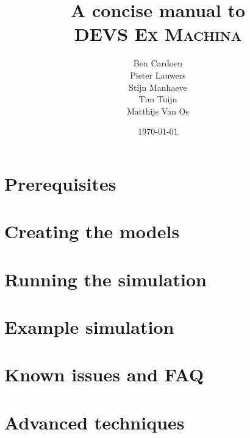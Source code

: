 \documentclass[10pt,a4paper]{report}
\title{A concise manual to\\\textsc{DEVS Ex Machina}}
\author{Ben Cardoen\\Pieter Lauwers\\Stijn Manhaeve\\Tim Tuijn\\Matthijs Van Os}
\date{\today}
\begin{document}
\maketitle
\tableofcontents{}


\chapter{Prerequisites}

\chapter{Creating the models}


\chapter{Running the simulation}


\appendix
\chapter{Example simulation}

\chapter{Known issues and FAQ}

\chapter{Advanced techniques}
\end{document}

